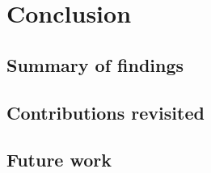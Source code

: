 \section{Conclusion}
\label{sec:conclusion}


\subsection{Summary of findings}
\label{sec:conclusion:summary}

\subsection{Contributions revisited}
\label{sec:conclusion:contributions}

\subsection{Future work}
\label{sec:conclusion:future}

